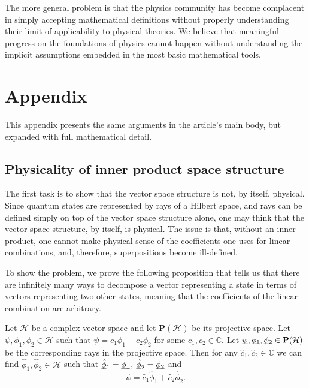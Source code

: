 \documentclass[10pt,twocolumn, nofootinbib]{revtex4-2}
\begin{document}
The more general problem is that the physics community has become complacent in simply accepting mathematical definitions without properly understanding their limit of applicability to physical theories. We believe that meaningful progress on the foundations of physics cannot happen without understanding the implicit assumptions embedded in the most basic mathematical tools.




\newcommand{\pj}[1] {\underbar{$#1$}}

\section*{Appendix}

This appendix presents the same arguments in the article's main body, but expanded with full mathematical detail.

\subsection{Physicality of inner product space structure}

The first task is to show that the vector space structure is not, by itself, physical. Since quantum states are represented by rays of a Hilbert space, and rays can be defined simply on top of the vector space structure alone, one may think that the vector space structure, by itself, is physical. The issue is that, without an inner product, one cannot make physical sense of the coefficients one uses for linear combinations, and, therefore, superpositions become ill-defined.

To show the problem, we prove the following proposition that tells us that there are infinitely many ways to decompose a vector representing a state in terms of vectors representing two other states, meaning that the coefficients of the linear combination are arbitrary.
\begin{prop}\label{vector_insufficient} Let $\mathcal{H}$ be a complex vector space and let $\textbf{P}(\mathcal{H})$ be its projective space. Let $\psi, \phi_1, \phi_2 \in \mathcal{H}$ such that $\psi = c_1 \phi_1 + c_2 \phi_2$ for some $c_1, c_2 \in \mathbb{C}$. Let $\pj{\psi}, \pj{\phi_1}, \pj{\phi_2} \in \textbf{P}(\mathcal{H})$ be the corresponding rays in the projective space. Then for any $\hat{c}_1, \hat{c}_2 \in \mathbb{C}$ we can find  $\hat{\phi}_1, \hat{\phi}_2 \in \mathcal{H}$ such that $\pj{\hat{\phi}}_1 = \pj{\phi_1}$, $\pj{\hat{\phi}}_2 = \pj{\phi_2}$ and
$$\psi = \hat{c}_1 \hat{\phi}_1 + \hat{c}_2 \hat{\phi}_2.$$
\end{prop}
\end{document}
